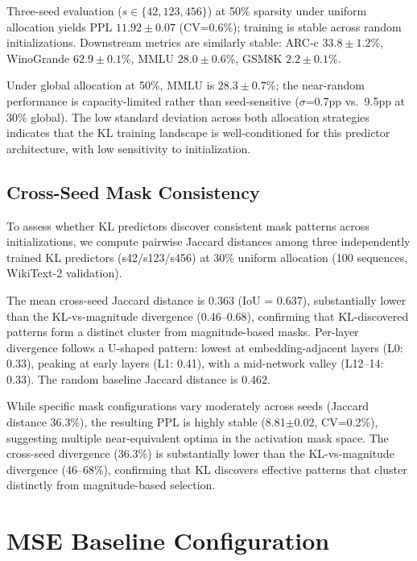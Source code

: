 Three-seed evaluation ($s \in \{42, 123, 456\}$) at 50\% sparsity under uniform allocation yields PPL $11.92 \pm 0.07$ (CV=0.6\%); training is stable across random initializations. %
Downstream metrics are similarly stable: ARC-c $33.8 \pm 1.2$\%, WinoGrande $62.9 \pm 0.1$\%, MMLU $28.0 \pm 0.6$\%, GSM8K $2.2 \pm 0.1$\%.

Under global allocation at 50\%, MMLU is $28.3 \pm 0.7$\%; the near-random performance is capacity-limited rather than seed-sensitive ($\sigma$=0.7pp vs.\ 9.5pp at 30\% global). %
The low standard deviation across both allocation strategies indicates that the KL training landscape is well-conditioned for this predictor architecture, with low sensitivity to initialization.

\subsection{Cross-Seed Mask Consistency}
\label{app:cross_seed_jaccard}

To assess whether KL predictors discover consistent mask patterns across initializations, we compute pairwise Jaccard distances among three independently trained KL predictors (s42/s123/s456) at 30\% uniform allocation (100 sequences, WikiText-2 validation). %

The mean cross-seed Jaccard distance is 0.363 (IoU = 0.637), substantially lower than the KL-vs-magnitude divergence (0.46--0.68), confirming that KL-discovered patterns form a distinct cluster from magnitude-based masks.
Per-layer divergence follows a U-shaped pattern: lowest at embedding-adjacent layers (L0: 0.33), peaking at early layers (L1: 0.41), with a mid-network valley (L12--14: 0.33). The random baseline Jaccard distance is 0.462.

While specific mask configurations vary moderately across seeds (Jaccard distance 36.3\%), the resulting PPL is highly stable (8.81$\pm$0.02, CV=0.2\%), suggesting multiple near-equivalent optima in the activation mask space.
The cross-seed divergence (36.3\%) is substantially lower than the KL-vs-magnitude divergence (46--68\%), confirming that KL discovers effective patterns that cluster distinctly from magnitude-based selection.


\section{MSE Baseline Configuration}
\label{app:mse_config}

